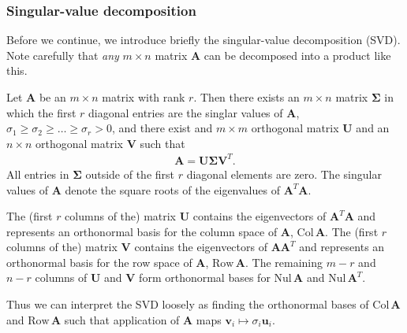 \documentclass[a4paper]{article}
\begin{document}
\begin{multicols}{2}
\subsubsection{Singular-value decomposition \label{sect:svd}}
Before we continue, we introduce briefly the singular-value decomposition (SVD). Note carefully that \textit{any} $m\times n$ matrix $\mathbf{A}$ can be decomposed into a product like this. 
\begin{grayframe}
Let $\mathbf{A}$ be an $m\times n$ matrix with rank $r$. Then there exists an $m\times n$ matrix $\bm{\Sigma}$ in which the first $r$ diagonal entries are the singlar values of $\mathbf{A}$, $\sigma_1\ge\sigma_2\ge\dots\ge\sigma_r>0$, and there exist and $m\times m$ orthogonal matrix $\mathbf{U}$ and an $n\times n$ orthogonal matrix $\mathbf{V}$ such that 
\begin{align}
\mathbf{A}=\mathbf{U}\bm\Sigma \mathbf{V}^T.
\end{align}
All entries in $\bm \Sigma$ outside of the first $r$ diagonal elements are zero. The singular values of $\mathbf{A}$ denote the square roots of the eigenvalues of $\mathbf{A}^T\mathbf{A}$.\autocite{lay2012linear}
\end{grayframe}
The (first $r$ columns of the) matrix $\mathbf{U}$ contains the eigenvectors of $\mathbf{A}^T\mathbf{A}$ and represents an orthonormal basis for the column space of $\mathbf{A}$, $\text{Col}\,\mathbf{A}$. The (first $r$ columns of the) matrix $\mathbf{V}$ contains the eigenvectors of $\mathbf{A}\mathbf{A}^T$ and represents an orthonormal basis for the row space of $\mathbf{A}$, $\text{Row}\,\mathbf{A}$. The remaining $m-r$ and $n-r$ columns of $\mathbf{U}$ and $\mathbf{V}$ form orthonormal bases for $\text{Nul}\,\mathbf{A}$ and $\text{Nul}\,\mathbf{A}^T$.

Thus we can interpret the SVD loosely as finding the orthonormal bases of $\text{Col}\,\mathbf{A}$ and $\text{Row}\,\mathbf{A}$ such that application of $\mathbf{A}$ maps $\mathbf{v}_i\mapsto \sigma_i\mathbf{u}_i$.


\end{multicols}
\end{document}
